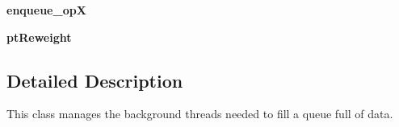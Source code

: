 \begin{DoxyCompactItemize}
\item 
\hypertarget{classCustomQueueRunner_1_1CustomQueueRunner_a87afd27e4fba7b890ef7cf7056dd01be}{{\bfseries enqueue\-\_\-op\-X}}\label{classCustomQueueRunner_1_1CustomQueueRunner_a87afd27e4fba7b890ef7cf7056dd01be}

\item 
\hypertarget{classCustomQueueRunner_1_1CustomQueueRunner_aba53122c1cf237949531b1c016628c76}{{\bfseries pt\-Reweight}}\label{classCustomQueueRunner_1_1CustomQueueRunner_aba53122c1cf237949531b1c016628c76}

\end{DoxyCompactItemize}


\subsection{Detailed Description}
\begin{DoxyVerb}This class manages the background threads needed to fill
    a queue full of data.
\end{DoxyVerb}
 

